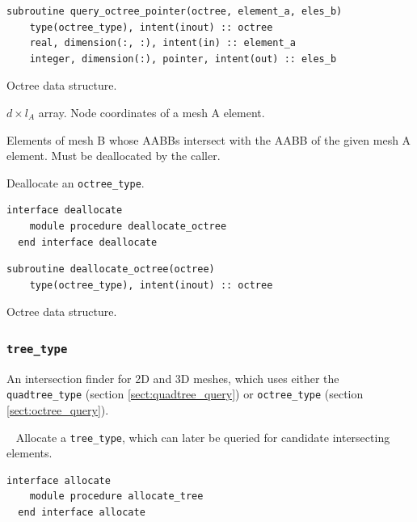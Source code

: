 \documentclass{article}
\begin{document}
\begin{lstlisting}[language=FORTRAN]
  subroutine query_octree_pointer(octree, element_a, eles_b)
    type(octree_type), intent(inout) :: octree
    real, dimension(:, :), intent(in) :: element_a
    integer, dimension(:), pointer, intent(out) :: eles_b
\end{lstlisting}

\begin{description}[font=\ttfamily\bfseries,leftmargin=2.2\parindent,labelindent=1.7\parindent,noitemsep]
  \item[octree] Octree data structure.
  \item[element\_a] $d \times l_A$ array. Node coordinates of a mesh A element.
  \item[eles\_b] Elements of mesh B whose AABBs intersect with the AABB of the
    given mesh A element. Must be deallocated by the caller.
\end{description}

\noindent Deallocate an \verb+octree_type+.
  
\begin{lstlisting}[language=FORTRAN]
  interface deallocate
    module procedure deallocate_octree
  end interface deallocate
\end{lstlisting}
  
\begin{lstlisting}[language=FORTRAN]
  subroutine deallocate_octree(octree)
    type(octree_type), intent(inout) :: octree
\end{lstlisting}

\begin{description}[font=\ttfamily\bfseries,leftmargin=2.2\parindent,labelindent=1.7\parindent,noitemsep]
  \item[octree] Octree data structure.
\end{description}

\subsubsection{\texttt{tree\_type}}

An intersection finder for 2D and 3D meshes, which uses either the
\verb+quadtree_type+ (section \ref{sect:quadtree_query}) or \verb+octree_type+
(section \ref{sect:octree_query}).

~\newline
Allocate a \verb+tree_type+, which can later be queried for candidate
intersecting elements.

\begin{lstlisting}[language=FORTRAN]
  interface allocate
    module procedure allocate_tree
  end interface allocate
\end{lstlisting}
  
\end{document}
